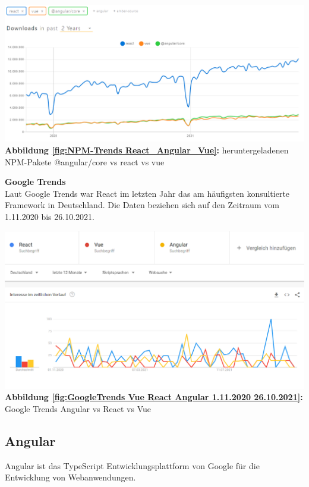 \begin{center}
  \includegraphics[scale=0.5]{sources/NPM-Trends React_Angular_Vue}\label{fig:NPM-Trends React_Angular_Vue}\\
  \textbf{Abbildung \autoref{fig:NPM-Trends React_Angular_Vue}:} heruntergeladenen NPM-Pakete @angular/core vs react vs vue
    {\cite{NPM01}}
\end{center}

\textbf{Google Trends}\\
Laut Google Trends war React im letzten Jahr das am häufigsten konsultierte Framework in Deutschland.
Die Daten beziehen sich auf den Zeitraum vom 1.11.2020 bis 26.10.2021.
\begin{center}
  \includegraphics[scale=0.5]{sources/GoogleTrends Vue React Angular 1.11.2020 26.10.2021}\label{fig:GoogleTrends Vue React Angular 1.11.2020 26.10.2021}\\
  \textbf{Abbildung \autoref{fig:GoogleTrends Vue React Angular 1.11.2020 26.10.2021}:} Google Trends Angular vs React vs Vue
    {\cite{GO01}}
\end{center}

\subsection{Angular}
Angular ist das TypeScript Entwicklungsplattform von Google für die Entwicklung von Webanwendungen.

